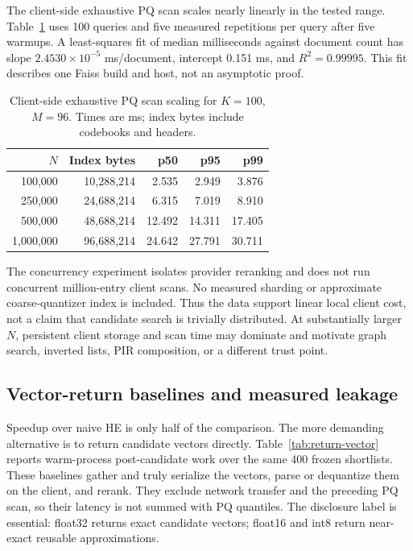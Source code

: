 \documentclass[pdflatex,sn-basic,Numbered]{sn-jnl}
\theoremstyle{plain}
\begin{document}
The client-side exhaustive PQ scan scales nearly linearly in the tested range. Table~\ref{tab:pq-scaling} uses 100 queries and five measured repetitions per query after five warmups. A least-squares fit of median milliseconds against document count has slope $2.4530\times10^{-5}$ ms/document, intercept 0.151 ms, and $R^2=0.99995$. This fit describes one Faiss build and host, not an asymptotic proof.

\begin{table}[t]
\caption{Client-side exhaustive PQ scan scaling for $K=100$, $M=96$. Times are ms; index bytes include codebooks and headers.}\label{tab:pq-scaling}
\centering
\small
\begin{tabular}{@{}rrrrr@{}}
\toprule
$N$ & Index bytes & p50 & p95 & p99 \\
\midrule
100,000 & 10,288,214 & 2.535 & 2.949 & 3.876 \\
250,000 & 24,688,214 & 6.315 & 7.019 & 8.910 \\
500,000 & 48,688,214 & 12.492 & 14.311 & 17.405 \\
1,000,000 & 96,688,214 & 24.642 & 27.791 & 30.711 \\
\bottomrule
\end{tabular}
\end{table}

The concurrency experiment isolates provider reranking and does not run concurrent million-entry client scans. No measured sharding or approximate coarse-quantizer index is included. Thus the data support linear local client cost, not a claim that candidate search is trivially distributed. At substantially larger $N$, persistent client storage and scan time may dominate and motivate graph search, inverted lists, PIR composition, or a different trust point.

\subsection{Vector-return baselines and measured leakage}\label{subsec:return-vector-results}

Speedup over naive HE is only half of the comparison. The more demanding alternative is to return candidate vectors directly. Table~\ref{tab:return-vector} reports warm-process post-candidate work over the same 400 frozen shortlists. These baselines gather and truly serialize the vectors, parse or dequantize them on the client, and rerank. They exclude network transfer and the preceding PQ scan, so their latency is not summed with PQ quantiles. The disclosure label is essential: float32 returns exact candidate vectors; float16 and int8 return near-exact reusable approximations.
\end{document}
